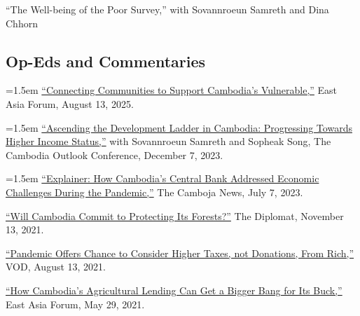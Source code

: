 \documentclass[10pt,a4paper]{article}
\begin{document}
	
	``The Well-being of the Poor Survey,'' with Sovannroeun Samreth and Dina Chhorn

\subsection*{Op-Eds and Commentaries}


	\hangindent=1.5em
	\href{https://eastasiaforum.org/2025/08/13/connecting-communities-to-support-cambodias-vulnerable/}{``Connecting Communities to Support Cambodia’s Vulnerable,''} East Asia Forum, August 13, 2025.\\ \vspace{-.5em}
	

	\hangindent=1.5em
	\href{https://coc2023.cdri.org.kh/ascending-the-development-ladder-in-cambodia-progressing-towards-higher-income-status/}{``Ascending the Development Ladder in Cambodia: Progressing Towards Higher Income Status,''} with Sovannroeun Samreth and Sopheak Song, The Cambodia Outlook Conference, December 7, 2023.\\ \vspace{-.5em}
	
	\hangindent=1.5em
	\href{https://cambojanews.com/explainer-how-cambodias-central-bank-addressed-economic-challenges-during-the-pandemic/}{``Explainer: How Cambodia's Central Bank Addressed Economic Challenges During the Pandemic,''} The Camboja News, July 7, 2023.\\ \vspace{-.5em}
	
	\href{https://thediplomat.com/2021/11/will-cambodia-commit-to-protecting-its-forests/}{``Will Cambodia Commit to Protecting Its Forests?''} The Diplomat, November 13, 2021.\\ \vspace{-.5em}

	\href{https://vodenglish.news/opinion-pandemic-offers-chance-to-consider-higher-taxes-not-donations-from-rich/}{``Pandemic Offers Chance to Consider Higher Taxes, not Donations, From Rich,''} VOD, August 13, 2021.\\ \vspace{-.5em}

	\href{https://www.eastasiaforum.org/2021/05/29/how-cambodias-agricultural-lending-can-get-a-bigger-bang-for-its-buck/}{``How Cambodia's Agricultural Lending Can Get a Bigger Bang for Its Buck,''} East Asia Forum, May 29, 2021.\\ \vspace{-.5em}
\end{document}
